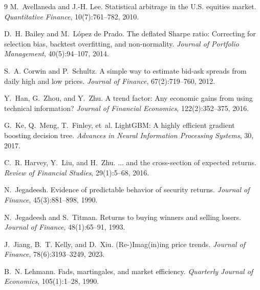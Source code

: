 \documentclass[11pt]{article}
\begin{document}
\begin{thebibliography}{9}
M.~Avellaneda and J.-H. Lee.
\newblock Statistical arbitrage in the U.S. equities market.
\newblock \emph{Quantitative Finance}, 10(7):761--782, 2010.

D.~H. Bailey and M.~L\'opez de Prado.
\newblock The deflated Sharpe ratio: Correcting for selection bias, backtest overfitting, and
non-normality.
\newblock \emph{Journal of Portfolio Management}, 40(5):94--107, 2014.

S.~A. Corwin and P.~Schultz.
\newblock A simple way to estimate bid-ask spreads from daily high and low prices.
\newblock \emph{Journal of Finance}, 67(2):719--760, 2012.

Y.~Han, G.~Zhou, and Y.~Zhu.
\newblock A trend factor: Any economic gains from using technical information?
\newblock \emph{Journal of Financial Economics}, 122(2):352--375, 2016.

G.~Ke, Q.~Meng, T.~Finley, et~al.
\newblock LightGBM: A highly efficient gradient boosting decision tree.
\newblock \emph{Advances in Neural Information Processing Systems}, 30, 2017.

C.~R. Harvey, Y.~Liu, and H.~Zhu.
\newblock $\ldots$ and the cross-section of expected returns.
\newblock \emph{Review of Financial Studies}, 29(1):5--68, 2016.

N.~Jegadeesh.
\newblock Evidence of predictable behavior of security returns.
\newblock \emph{Journal of Finance}, 45(3):881--898, 1990.

N.~Jegadeesh and S.~Titman.
\newblock Returns to buying winners and selling losers.
\newblock \emph{Journal of Finance}, 48(1):65--91, 1993.

J.~Jiang, B.~T. Kelly, and D.~Xiu.
\newblock (Re-)Imag(in)ing price trends.
\newblock \emph{Journal of Finance}, 78(6):3193--3249, 2023.

B.~N. Lehmann.
\newblock Fads, martingales, and market efficiency.
\newblock \emph{Quarterly Journal of Economics}, 105(1):1--28, 1990.
\end{thebibliography}
\end{document}
